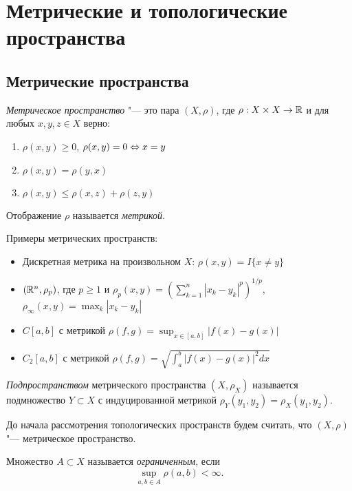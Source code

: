 \documentclass[main]{subfiles}
\begin{document}
\section{Метрические и топологические пространства}
\subsection{Метрические пространства}

\begin{definition}
  \emph{Метрическое пространство} "--- это
  пара \( (X, \rho) \), где \( \rho : X \times X \to \mathbb{R} \) и
  для любых \( x, y, z \in X \) верно:
  \begin{enumerate}
    \item \( \rho(x, y) \ge 0 \), \( \rho(x, y) = 0 \Leftrightarrow x = y \)
    \item \( \rho(x, y) = \rho(y, x) \)
    \item \( \rho(x, y) \le \rho(x, z) + \rho(z, y) \)
  \end{enumerate}
  Отображение \( \rho \) называется \emph{метрикой}.
\end{definition}

Примеры метрических пространств:
\begin{itemize}
  \item Дискретная метрика на произвольном \( X \):
    \( \rho(x, y) = I\{ x \ne y \} \)
  \item 
    \( (\mathbb{R}^n, \rho_p) \), где \( p \ge 1 \) и
    \( \rho_p(x, y) = \left( \sum_{k=1}^{n}
    |x_k - y_k|^p \right)^{1/p} \),
    \( \rho_\infty(x, y) = \max_k |x_k - y_k| \)
  \item 
    \( C[a, b] \) с метрикой
    \( \rho(f, g) = \sup_{x \in [a, b]} |f(x) - g(x)| \)
  \item \( C_2[a, b] \) с метрикой
    \( \rho(f, g) = \sqrt{\int_a^b |f(x) - g(x)|^2 dx} \)
\end{itemize}

\begin{definition}
  \emph{Подпространством} метрического пространства \( (X, \rho_X) \)
  называется подмножество \( Y \subset X \) с индуцированной метрикой
  \( \rho_Y(y_1, y_2) = \rho_X(y_1, y_2) \).
\end{definition}

До начала рассмотрения топологических пространств будем считать,
что \( (X, \rho) \) "--- метрическое пространство.
  
\begin{definition}
  Множество \( A \subset X \) называется \emph{ограниченным},
  если
  \[ \sup_{a, b \in A} \rho(a, b) < \infty. \]
\end{definition}
\end{document}
